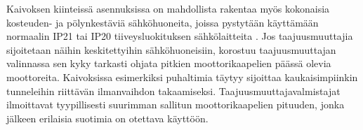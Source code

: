 \documentclass[finnish,12pt,a4paper,pdftex,elec,utf8]{aaltothesis}
\begin{document}
\noindent
Kaivoksen kiinteissä asennuksissa on mahdollista rakentaa myös kokonaisia kosteuden- ja pölynkestäviä sähköhuoneita, joissa pystytään käyttämään normaalin IP21 tai IP20 tiiveysluokituksen sähkölaitteita \cite[s. 253]{Hakapää}. Jos taajuusmuuttajia sijoitetaan näihin keskitettyihin sähköhuoneisiin, korostuu taajuusmuuttajan valinnassa sen kyky tarkasti ohjata pitkien moottorikaapelien päässä olevia moottoreita. Kaivoksissa esimerkiksi puhaltimia täytyy sijoittaa kaukaisimpiinkin tunneleihin riittävän ilmanvaihdon takaamiseksi. Taajuusmuuttajavalmistajat ilmoittavat tyypillisesti suurimman sallitun moottorikaapelien pituuden, jonka jälkeen erilaisia suotimia on otettava käyttöön.








\end{document}
